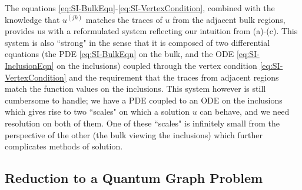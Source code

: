 The equations \eqref{eq:SI-BulkEqn}-\eqref{eq:SI-VertexCondition}, combined with the knowledge that $u^{(jk)}$ matches the traces of $u$ from the adjacent bulk regions, provides us with a reformulated system reflecting our intuition from (a)-(c).
This system is also ``strong" in the sense that it is composed of two differential equations (the PDE \eqref{eq:SI-BulkEqn} on the bulk, and the ODE \eqref{eq:SI-InclusionEqn} on the inclusions) coupled through the vertex condition \eqref{eq:SI-VertexCondition} and the requirement that the traces from adjacent regions match the function values on the inclusions.
This system however is still cumbersome to handle; we have a PDE coupled to an ODE on the inclusions which gives rise to two ``scales" on which a solution $u$ can behave, and we need resolution on both of them.
One of these ``scales" is infinitely small from the perspective of the other (the bulk viewing the inclusions) which further complicates methods of solution.

\subsection{Reduction to a Quantum Graph Problem} \label{ssec:SI-ToQG}

